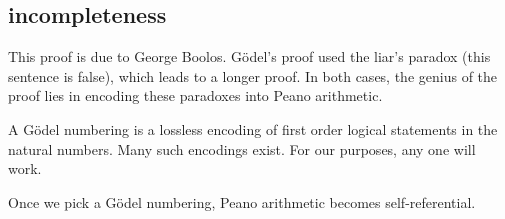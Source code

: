 \message{ !name(truth.tex)}\documentclass{scrbook}
\begin{document}
\subsection[Incompleteness]{incompleteness} 
This proof is due to George Boolos. Gödel's proof used the liar's paradox (this sentence is false), which leads to a longer proof.\cite{wiki:incomplete-sketch} In both cases, the genius of the proof lies in encoding these paradoxes into Peano arithmetic. 

\begin{defn}
  A Gödel numbering is a lossless encoding of first order logical statements in the natural numbers. Many such encodings exist. For our purposes, any one will work. 
\end{defn}
Once we pick a Gödel numbering, Peano arithmetic becomes self-referential.  
\end{document}
